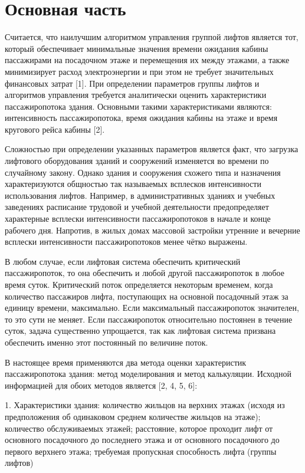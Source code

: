 \section{ Основная часть}

	Считается, что наилучшим алгоритмом управления группой лифтов является тот, который обеспечивает минимальные значения
		времени ожидания кабины пассажирами на посадочном этаже и перемещения их между этажами, а также минимизирует расход
		электроэнергии и при этом не требует значительных финансовых затрат [1].
		При определении параметров группы лифтов и алгоритмов управления требуется аналитически оценить характеристики
		пассажиропотока здания.
		Основными такими характеристиками являются: интенсивность пассажиропотока, время ожидания кабины на этаже и время
		кругового рейса кабины [2].
		
	Сложностью при определении указанных параметров является факт, что загрузка лифтового
		оборудования зданий и сооружений изменяется во времени по случайному закону. Однако здания и сооружения схожего типа
		и назначения характеризуются общностью так называемых всплесков интенсивности использования лифтов.
		Например, в административных зданиях и учебных заведениях расписание трудовой и учебной деятельности предопределяет
		характерные всплески интенсивности пассажиропотоков в начале и конце рабочего дня.
		Напротив, в жилых домах массовой застройки утренние и вечерние всплески интенсивности пассажиропотоков
		менее чётко выражены.

	В любом случае, если лифтовая система обеспечить критический пассажиропоток, то она обеспечить и любой другой пассажиропоток
		в любое время суток. Критический поток определяется некоторым временем, когда количество пассажиров лифта, поступающих на
		основной посадочный этаж за единицу времени, максимально. Если максимальный пассажиропоток значителен, то это сути не меняет.
		Если пассажиропоток относительно постоянен в течение суток, задача существенно упрощается, так как лифтовая система
		призвана обеспечить именно этот постоянный по величине поток.

	В настоящее время применяются два метода оценки характеристик пассажиропотока здания: метод моделирования и метод калькуляции.
		Исходной информацией для обоих методов является [2, 4, 5, 6]:

	1. Характеристики здания: количество жильцов на верхних этажах (исходя из предположения об одинаковом среднем
		количестве жильцов на этаже); количество обслуживаемых этажей; расстояние, которое проходит лифт от основного посадочного
		до последнего этажа и от основного посадочного до первого верхнего этажа; требуемая пропускная способность лифта (группы лифтов)
		

